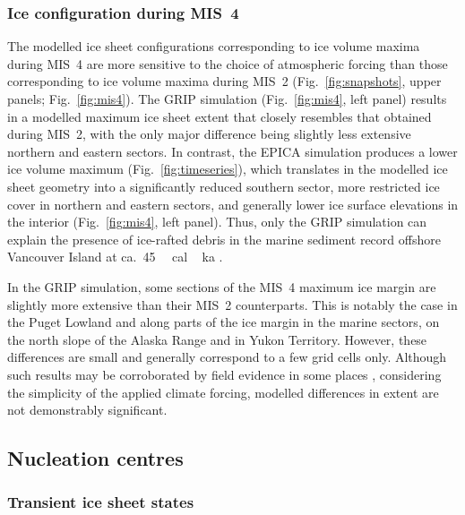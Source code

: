 \documentclass[tc]{copernicus}
\begin{document}
\subsubsection{Ice configuration during MIS~4}
\label{sec:mis4}

The modelled ice sheet configurations corresponding to ice volume maxima during
MIS~4 are more sensitive to the choice of atmospheric forcing than those
corresponding to ice volume maxima during MIS~2 (Fig.~\ref{fig:snapshots},
upper panels;
Fig.~\ref{fig:mis4}). The GRIP simulation (Fig.~\ref{fig:mis4}, left panel)
results in a modelled maximum ice sheet extent that closely resembles that
obtained
during MIS~2, with the only major difference being slightly less extensive
northern and eastern sectors. In contrast, the EPICA simulation produces a lower
ice volume maximum (Fig.~\ref{fig:timeseries}), which translates in the
modelled ice sheet geometry into a significantly reduced southern sector, more
restricted ice cover in northern and eastern sectors, and generally lower
ice surface elevations in the interior (Fig.~\ref{fig:mis4}, left panel).
Thus, only the GRIP simulation can explain the presence of ice-rafted debris
in the marine sediment record offshore Vancouver Island at
ca.~45\,\unit{\,cal\,ka} \citep{Cosma.etal.2008}.

In the GRIP simulation, some sections of the MIS~4 maximum ice margin are
slightly more extensive than their MIS~2 counterparts. This is notably the case
in the Puget Lowland and along parts of the ice margin in the marine sectors,
on the north slope of the Alaska Range and in Yukon Territory. However, these
differences
are small and generally correspond to a few grid cells only. Although such
results may be corroborated by field evidence in some places
\citep[e.g.][]{Ward.etal.2007}, considering the simplicity of the applied
climate forcing, modelled differences in extent are not demonstrably
significant.


\subsection{Nucleation centres}

\subsubsection{Transient ice sheet states}
\end{document}
